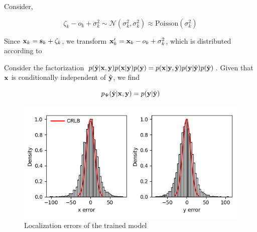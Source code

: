 \documentclass{article}
\begin{document}
Consider,

\begin{equation}
\zeta_{k} - o_{k} + \sigma_{k}^{2} \sim \mathcal{N}(\sigma_{k}^{2},\sigma_{k}^{2}) \approx \mathrm{Poisson}(\sigma_{k}^{2})
\end{equation}

Since $\bold{x}_{k} = \bold{s}_{k} + \zeta_{k}$, we transform $\bold{x}_{k}' = \bold{x}_{k} - o_{k} + \sigma_{k}^{2}$, which is distributed according to 

Consider the factorization $p(\hat{\bold{y}}|\bold{x},\bold{y})p(\bold{x}|\bold{y})p(\bold{y})=p(\bold{x}|\bold{y},\hat{\bold{y}})p(\bold{y}|\hat{\bold{y}})p(\hat{\bold{y}})$. Given that $\bold{x}$ is conditionally independent of $\hat{\bold{y}}$, we find

\begin{equation*}
p_{\Psi}(\hat{\bold{y}}|\bold{x},\bold{y})=p(\bold{y}|\hat{\bold{y}})
\end{equation*}

\begin{figure}
\centering
\includegraphics[scale=0.8]{Errors.png}
\caption{Localization errors of the trained model}
\end{figure}
\end{document}
